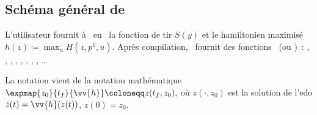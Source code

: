 \subsection{Sch\'ema g\'en\'eral de \hampath}

L'utilisateur fournit \`a \hampath\ en \fortran\ la fonction de tir $S(y)$ et le hamiltonien maximis\'e $h(z) \coloneqq \max_u H(z,p^0,u)$.
Apr\`es compilation, \hampath\ fournit des fonctions \matlab\ (ou \python)~:
, , , , , , , , \ldots

\begin{myremark}
    La notation  vient de la notation math\'ematique
    $
        \expmap{z_0}{t_f}{\vv{h}} \coloneqq z(t_f,z_0),
    $
    o\`u $z(\cdot,z_0)$ est la solution de l'edo $\dot{z}(t) = \vv{h}(z(t))$, $z(0) = z_0$.
\end{myremark}

